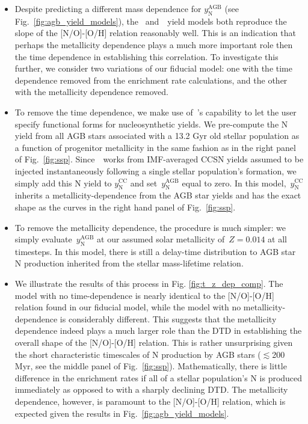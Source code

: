 \documentclass[ms.tex]{subfiles}
\begin{document}
\begin{itemize}
	\item Despite predicting a different mass dependence for 
	$y_\text{N}^\text{AGB}$ (see Fig.~\ref{fig:agb_yield_models}), the
	\cristallo~and~\ventura~yield models both reproduce the slope of the
	[N/O]-[O/H] relation reasonably well.
	This is an indication that perhaps the metallicity dependence plays a much
	more important role then the time dependence in establishing this
	correlation.
	To investigate this further, we consider two variations of our fiducial
	model: one with the time dependence removed from the enrichment rate
	calculations, and the other with the metallicity dependence removed.

	\item To remove the time dependence, we make use of~\vice's capability to
	let the user specify functional forms for nucleosynthetic yields.
	We pre-compute the N yield from all AGB stars associated with a 13.2 Gyr
	old stellar population as a function of progenitor metallicity in the same
	fashion as in the right panel of Fig.~\ref{fig:ssp}.
	Since~\vice~works from IMF-averaged CCSN yields assumed to be injected
	instantaneously following a single stellar population's formation, we simply
	add this N yield to $y_\text{N}^\text{CC}$ and set~$y_\text{N}^\text{AGB}$
	equal to zero.
	In this model,~$y_\text{N}^\text{CC}$ inherits a metallicity-dependence
	from the AGB star yields and has the exact shape as the curves in the
	right hand panel of Fig.~\ref{fig:ssp}.

	\item To remove the metallicity dependence, the procedure is much simpler:
	we simply evaluate~$y_\text{N}^\text{AGB}$ at our assumed solar metallicity
	of~$Z = 0.014$ at all timesteps.
	In this model, there is still a delay-time distribution to AGB star N
	production inherited from the stellar mass-lifetime relation.

	\item We illustrate the results of this process in Fig.
	\ref{fig:t_z_dep_comp}.
	The model with no time-dependence is nearly identical to the [N/O]-[O/H]
	relation found in our fiducial model, while the model with no
	metallicity-dependence is considerably different.
	This suggests that the metallicity dependence indeed plays a much larger
	role than the DTD in establishing the overall shape of the [N/O]-[O/H]
	relation.
	This is rather unsurprising given the short characteristic timescales of N
	production by AGB stars ($\lesssim$200 Myr, see the middle panel of
	Fig.~\ref{fig:ssp}).
	Mathematically, there is little difference in the enrichment rates if all
	of a stellar population's N is produced immediately as opposed to with a
	sharply declining DTD.
	The metallicity dependence, however, is paramount to the [N/O]-[O/H]
	relation, which is expected given the results in
	Fig.~\ref{fig:agb_yield_models}.


\end{itemize}
\end{document}
